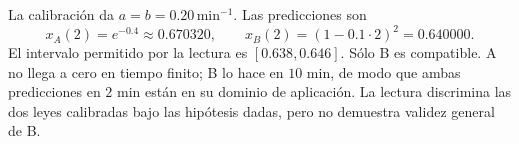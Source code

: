 La calibración da \(a=b=0.20\,\mathrm{min}^{-1}\). Las predicciones son
\[
x_A(2)=e^{-0.4}\approx0.670320,
\qquad x_B(2)=(1-0.1\cdot2)^2=0.640000.
\]
El intervalo permitido por la lectura es \([0.638,0.646]\). Sólo B es compatible. A no llega a cero en tiempo finito; B lo hace en \(10\) min, de modo que ambas predicciones en \(2\) min están en su dominio de aplicación. La lectura discrimina las dos leyes calibradas bajo las hipótesis dadas, pero no demuestra validez general de B.
